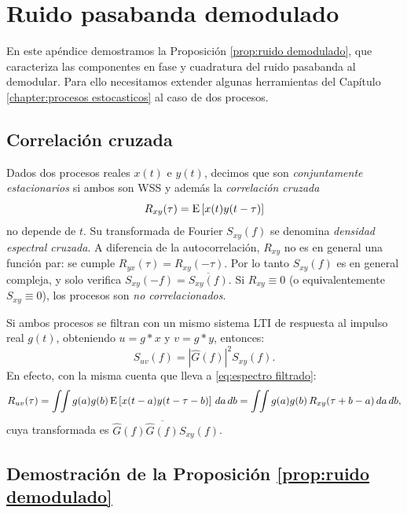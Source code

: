 \section{Ruido pasabanda demodulado}\label{app:ruido pasabanda}

En este apéndice demostramos la Proposición \ref{prop:ruido demodulado}, que caracteriza las componentes en fase y cuadratura del ruido pasabanda al demodular. Para ello necesitamos extender algunas herramientas del Capítulo \ref{chapter:procesos estocasticos} al caso de dos procesos.

\subsection*{Correlación cruzada}

Dados dos procesos reales $x(t)$ e $y(t)$, decimos que son \emph{conjuntamente estacionarios} si ambos son WSS y además la \emph{correlación cruzada}
\begin{equation*}
    R_{xy}(\tau) = \mathrm{E}\left[x(t)y(t-\tau)\right]
\end{equation*}
no depende de $t$. Su transformada de Fourier $S_{xy}(f)$ se denomina \emph{densidad espectral cruzada}. A diferencia de la autocorrelación, $R_{xy}$ no es en general una función par: se cumple $R_{yx}(\tau)=R_{xy}(-\tau)$. Por lo tanto $S_{xy}(f)$ es en general compleja, y solo verifica $S_{xy}(-f)=\overline{S_{xy}(f)}$. Si $R_{xy}\equiv 0$ (o equivalentemente $S_{xy}\equiv 0$), los procesos son \emph{no correlacionados}.

Si ambos procesos se filtran con un mismo sistema LTI de respuesta al impulso real $g(t)$, obteniendo $u=g*x$ y $v=g*y$, entonces:
\begin{equation}\label{eq:espectro cruzado filtrado}
    S_{uv}(f) = |\hat{G}(f)|^2 S_{xy}(f).
\end{equation}
En efecto, con la misma cuenta que lleva a \eqref{eq:espectro filtrado}:
\begin{equation*}
    R_{uv}(\tau) = \int\!\!\int g(a)g(b)\,\mathrm{E}\left[x(t-a)y(t-\tau-b)\right]\,da\,db = \int\!\!\int g(a)g(b)\,R_{xy}(\tau+b-a)\,da\,db,
\end{equation*}
cuya transformada es $\hat{G}(f)\overline{\hat{G}(f)}S_{xy}(f)$.

\subsection*{Demostración de la Proposición \ref{prop:ruido demodulado}}

